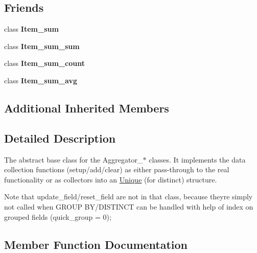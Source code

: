 \subsection*{Friends}
\begin{DoxyCompactItemize}
\item 
\mbox{\label{classAggregator_afdaf2fcbe4bca3f9cf9e54d9302c0d69}} 
class {\bfseries Item\+\_\+sum}
\item 
\mbox{\label{classAggregator_a2afeb7cbcc97ddd2c3c74cf87352e0ab}} 
class {\bfseries Item\+\_\+sum\+\_\+sum}
\item 
\mbox{\label{classAggregator_acfaf1c17289ab0e71cb92e85c6e40ee5}} 
class {\bfseries Item\+\_\+sum\+\_\+count}
\item 
\mbox{\label{classAggregator_a43563950efa7ae2387d3389fae2c0d09}} 
class {\bfseries Item\+\_\+sum\+\_\+avg}
\end{DoxyCompactItemize}
\subsection*{Additional Inherited Members}


\subsection{Detailed Description}
The abstract base class for the Aggregator\+\_\+$\ast$ classes. It implements the data collection functions (setup/add/clear) as either pass-\/through to the real functionality or as collectors into an \mbox{\hyperlink{classUnique}{Unique}} (for distinct) structure.

Note that update\+\_\+field/reset\+\_\+field are not in that class, because they\textquotesingle{}re simply not called when G\+R\+O\+UP B\+Y/\+D\+I\+S\+T\+I\+N\+CT can be handled with help of index on grouped fields (quick\+\_\+group = 0); 

\subsection{Member Function Documentation}
\mbox{\label{classAggregator_a70e0d53834f2672f3ec57c96e35a9a60}} 
